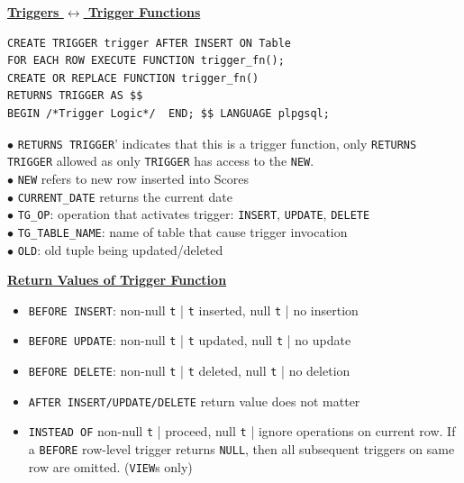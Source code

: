 \documentclass[10pt,landscape]{article}
\begin{document}
\begin{multicols*}{3}
\textbf{\underline{Triggers $\leftrightarrow$ Trigger Functions}}

\begin{lstlisting}
CREATE TRIGGER trigger AFTER INSERT ON Table
FOR EACH ROW EXECUTE FUNCTION trigger_fn();
CREATE OR REPLACE FUNCTION trigger_fn() 
RETURNS TRIGGER AS $$
BEGIN /*Trigger Logic*/  END; $$ LANGUAGE plpgsql;
\end{lstlisting}
$\bullet$ \verb|RETURNS TRIGGER|' indicates that this is a trigger function, only \verb|RETURNS TRIGGER| allowed as only \verb|TRIGGER| has access to the \verb|NEW|. \\
$\bullet$ \verb|NEW| refers to new row inserted into Scores \\
$\bullet$ \verb|CURRENT_DATE| returns the current date \\ 
$\bullet$ \verb|TG_OP|: operation that activates trigger: \verb|INSERT|, \verb|UPDATE|, \verb|DELETE| \\
$\bullet$ \verb|TG_TABLE_NAME|: name of table that cause trigger invocation \\
$\bullet$ \verb|OLD|: old tuple being updated/deleted 

\textbf{\underline{Return Values of Trigger Function}}
\begin{itemize}[topsep=0pt,noitemsep,wide=0pt, leftmargin=\dimexpr{} + 2\relax]
    \item \verb|BEFORE INSERT|: non-null \verb|t| | \verb|t| inserted, null \verb|t| | no insertion
    \item \verb|BEFORE UPDATE|: non-null \verb|t| | \verb|t| updated, null \verb|t| | no update
    \item \verb|BEFORE DELETE|: non-null \verb|t| | \verb|t| deleted, null \verb|t| | no deletion
    \item \verb|AFTER INSERT/UPDATE/DELETE| return value does not matter
    \item \verb|INSTEAD OF| non-null \verb|t| | proceed, null \verb|t| | ignore operations on current row. If a \verb|BEFORE|
    row-level trigger returns \verb|NULL|, then all subsequent triggers on same row are omitted. (\verb|VIEW|s only)
\end{itemize}


\end{multicols*}
\end{document}
